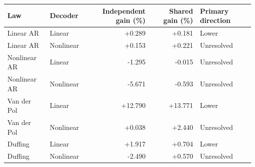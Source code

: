 \begin{tabular}{llrrl}
\toprule
Law & Decoder & Independent gain (\%) & Shared gain (\%) & Primary direction \\
\midrule
Linear AR & Linear & +0.289 & +0.181 & Lower \\
Linear AR & Nonlinear & +0.153 & +0.221 & Unresolved \\
Nonlinear AR & Linear & -1.295 & -0.015 & Unresolved \\
Nonlinear AR & Nonlinear & -5.671 & -0.593 & Unresolved \\
Van der Pol & Linear & +12.790 & +13.771 & Lower \\
Van der Pol & Nonlinear & +0.038 & +2.440 & Unresolved \\
Duffing & Linear & +1.917 & +0.704 & Lower \\
Duffing & Nonlinear & -2.490 & +0.570 & Unresolved \\
\bottomrule
\end{tabular}
